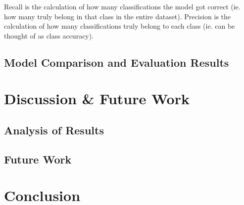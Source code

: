 \documentclass[10pt,sigconf,letterpaper,nonacm]{acmart}
\begin{document}
Recall is the calculation of how many classifications the model got correct (ie. how many truly belong in that class in the entire dataset). 
Precision is the calculation of how many classifications truly belong to each class (ie. can be thought of as class accuracy).


\subsection{Model Comparison and Evaluation Results}


\section{Discussion \& Future Work}
\subsection{Analysis of Results}
\subsection{Future Work}

\section{Conclusion}





\cite{10.1145/2388576.2388608}
\cite{10.5555/3432601.3432608}
\cite{10.1109/TNET.2014.2320577}
\cite{scikit-learn}
\cite{Wireshark}
\end{document}
